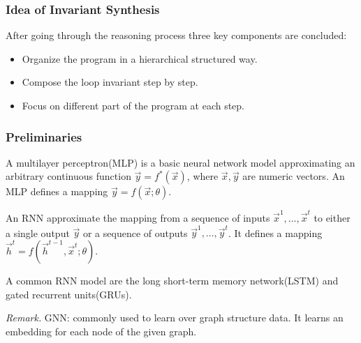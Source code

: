 \documentclass[11pt]{beamer}
\begin{document}
\begin{frame}\frametitle{Idea of Invariant Synthesis}

After going through the reasoning process three key components are concluded:
\begin{itemize}
\item Organize the program in a hierarchical structured way.
\item Compose the loop invariant step by step.

\item Focus on different part of the program at each step.
\end{itemize}

\end{frame}
\begin{frame}\frametitle{Preliminaries}
\begin{definition}
A multilayer perceptron(MLP) is a basic neural network model approximating an arbitrary continuous function $\vec{y} =f^*(\vec{x})$, where $\vec{x}, \vec{y}$ are numeric vectors.
An MLP defines a mapping $\vec{y} = f(\vec{x};\theta)$.

\end{definition}

\begin{definition}[RNN]
An RNN approximate the mapping from a sequence of inputs $\vec{x}^1, \ldots, \vec{x}^t$ to either a single output $\vec{y}$ or a sequence of outputs $\vec{y}^1, \ldots, \vec{y}^t$. It defines a mapping $\vec{h}^t = f(\vec{h}^{t - 1}, \vec{x}^t; \theta)$.

A common RNN model are the long short-term memory network(LSTM) and gated recurrent units(GRUs).

\end{definition}

\textit{Remark.} GNN: commonly used to learn over graph structure data. It learns an embedding for each node of the given graph.
\end{frame}
\end{document}
